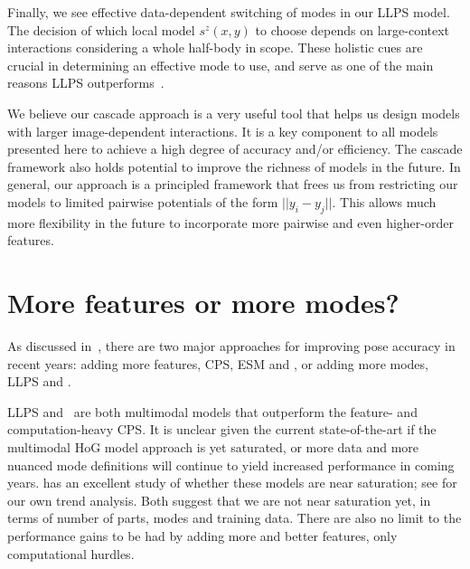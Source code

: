 Finally, we see effective data-dependent switching of modes in our LLPS model.  
The decision of which local model $s^z(x,y)$ to choose depends on large-context 
interactions considering a whole half-body in scope. These holistic cues are 
crucial in determining an effective mode to use, and serve as one of the main 
reasons LLPS outperforms~\citet{deva2011}.

We believe our cascade approach is a very useful tool that helps us design 
models with larger image-dependent interactions.  It is a key component to all 
models presented here to achieve a high degree of accuracy and/or efficiency.  
The cascade framework also holds potential to improve the richness of models in 
the future.  In general, our approach is a principled framework that frees us 
from restricting our models to limited pairwise potentials of the form $||y_i - 
y_j||$.  This allows much more flexibility in the future to incorporate more 
pairwise and even higher-order features. 

\section{More features or more modes?}
As discussed in~, there are two major approaches for improving 
pose accuracy in recent years: adding more features, \eg CPS, ESM and 
\citet{ferrari08,eichner09,ddtran}, or adding more modes, \eg LLPS and 
\citet{dpm,wang2011,deva2011,johnson11}.  

LLPS and~\citet{deva2011} are both multimodal models that outperform the 
feature- and computation-heavy CPS.  It is unclear given the current 
state-of-the-art if the multimodal HoG model approach is yet saturated, or more 
data and more nuanced mode definitions will continue to yield increased 
performance in coming years.  \citet{zhuwe} has an excellent study of whether 
these models are near saturation; see  for our own 
trend analysis.  Both suggest that we are not near saturation yet, in terms of 
number of parts, modes and training data. There are also no limit to the 
performance gains to be had by adding more and better features, only 
computational hurdles.

